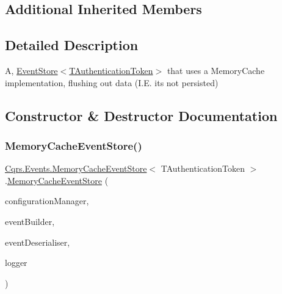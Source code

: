 \subsection*{Additional Inherited Members}


\subsection{Detailed Description}
A, \hyperlink{classCqrs_1_1Events_1_1EventStore_a6346cb2aea4c5b4e740dc6cfb15abab8_a6346cb2aea4c5b4e740dc6cfb15abab8}{Event\+Store$<$\+T\+Authentication\+Token$>$} that uses a Memory\+Cache implementation, flushing out data (I.\+E. it\textquotesingle{}s not persisted) 



\subsection{Constructor \& Destructor Documentation}
\mbox{\label{classCqrs_1_1Events_1_1MemoryCacheEventStore_a4de9139e05d35cb62ba295569a1dc94f_a4de9139e05d35cb62ba295569a1dc94f}} 
\subsubsection{\texorpdfstring{Memory\+Cache\+Event\+Store()}{MemoryCacheEventStore()}}
{\footnotesize\ttfamily \hyperlink{classCqrs_1_1Events_1_1MemoryCacheEventStore}{Cqrs.\+Events.\+Memory\+Cache\+Event\+Store}$<$ T\+Authentication\+Token $>$.\hyperlink{classCqrs_1_1Events_1_1MemoryCacheEventStore}{Memory\+Cache\+Event\+Store} (\begin{DoxyParamCaption}\item[{\hyperlink{interfaceCqrs_1_1Configuration_1_1IConfigurationManager}{I\+Configuration\+Manager}}]{configuration\+Manager,  }\item[{\hyperlink{interfaceCqrs_1_1Events_1_1IEventBuilder}{I\+Event\+Builder}$<$ T\+Authentication\+Token $>$}]{event\+Builder,  }\item[{\hyperlink{interfaceCqrs_1_1Events_1_1IEventDeserialiser}{I\+Event\+Deserialiser}$<$ T\+Authentication\+Token $>$}]{event\+Deserialiser,  }\item[{I\+Logger}]{logger }\end{DoxyParamCaption})}



